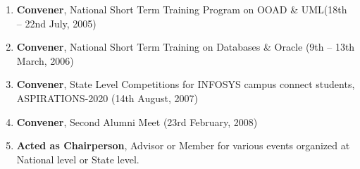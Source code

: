 \begin{enumerate}
\item
\textbf{Convener}, National Short Term Training Program on OOAD \& UML(18th – 22nd July, 2005) 

\item
\textbf{Convener}, National Short Term Training on Databases \& Oracle (9th – 13th March, 2006) 

\item
\textbf{Convener}, State Level Competitions for INFOSYS campus connect students, ASPIRATIONS-2020 (14th August, 2007) 

\item
\textbf{Convener}, Second Alumni Meet (23rd February, 2008) 

\item
\textbf{Acted as Chairperson}, Advisor or Member for various events organized at National level or State level.

\end{enumerate}